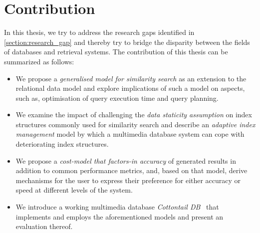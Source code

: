 


\section{Contribution}

In this thesis, we try to address the research gaps identified in \cref{section:research_gap} and thereby try to bridge the disparity between the fields of databases and retrieval systems. The contribution of this thesis can be summarized as follows:

\begin{itemize}
    \item We propose a \emph{generalised model for similarity search} as an extension to the relational data model and explore implications of such a model on aspects, such as, optimisation of query execution time and query planning.
    \item We examine the impact of challenging the \emph{data staticity assumption} on index structures commonly used for similarity search and describe an \emph{adaptive index management} model by which a multimedia database system can cope with deteriorating index structures.
    \item We propose a \emph{cost-model that factors-in accuracy} of generated results in addition to common performance metrics, and, based on that model, derive mechanisms for the user to express their preference for either accuracy or speed at different levels of the system.
    \item We introduce a working multimedia database \emph{Cottontail DB}~\cite{Gasser:2020Cottontail} that implements and employs the aforementioned models and present an evaluation thereof.
\end{itemize}


